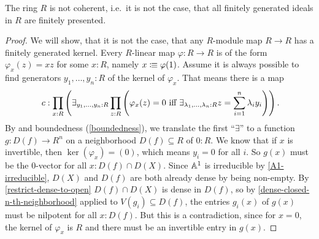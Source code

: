 \begin{theorem}%
  The ring $R$ is not coherent, i.e.\ it is not the case,
  that all finitely generated ideals in $R$ are finitely presented.
\end{theorem}

\begin{proof}
  We will show, that it is not the case,
  that any $R$-module map $R\to R$ has a finitely generated kernel.
  Every $R$-linear map $\varphi:R\to R$
  is of the form $\varphi_x(z) = xz$ for some $x : R$,
  namely $x\vcentcolon\mspace{-1.2mu}\equiv \varphi(1)$.
  Assume it is always possible to find generators $y_1,\dots,y_n:R$ of the kernel of $\varphi_x$.
  That means there is a map
  \[
    c:\prod_{x:R}
    \left(
      \exists_{y_1,\dots,y_n:R}
      \prod_{z:R}
      \left(
        \varphi_x(z)=0 \text{ iff } \exists_{\lambda_1,\dots,\lambda_n:R}z=\sum_{i=1}^n \lambda_i y_i
      \right)
    \right)
    \rlap{.}
  \]
  By  and boundedness (\cref{boundedness}),
  we translate the first ``$\exists$'' to a function $g : D(f) \to R^n$
  on a neighborhood $D(f) \subseteq R$ of $0:R$.
  We know that if $x$ is invertible, then $\ker(\varphi_x)=(0)$, which means $y_i=0$ for all $i$.
  So $g(x)$ must be the 0-vector for all $x:D(f)\cap D(X)$.
  Since $\mathbb{A}^1$ is irreducible by \cref{A1-irreducible},
  $D(X)$ and $D(f)$ are both already dense by being non-empty.
  By \cref{restrict-dense-to-open} $D(f)\cap D(X)$ is dense in $D(f)$,
  so by \cref{dense-closed-n-th-neighborhood}
  applied to $V(g_i) \subseteq D(f)$,
  the entries $g_i(x)$ of $g(x)$ must be nilpotent for all $x:D(f)$.
  But this is a contradiction, since for $x = 0$,
  the kernel of $\varphi_x$ is $R$ and there must be an invertible entry in $g(x)$.
\end{proof}
